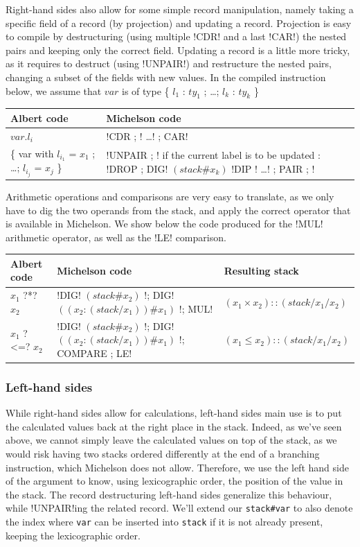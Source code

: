 \documentclass{report}
\begin{document}
Right-hand sides also allow for some simple record manipulation, namely taking a specific field of a record (by projection) and updating a record. Projection is easy to compile by destructuring (using multiple !CDR! and a last !CAR!) the nested pairs and keeping only the correct field. Updating a record is a little more tricky, as it requires to destruct (using !UNPAIR!) and restructure the nested pairs, changing a subset of the fields with new values. In the compiled instruction below, we assume that $var$ is of type \{ $l_1$ : $ty_1$ ; \ldots ; $l_k$ : $ty_k$ \}

{\small
\begin{longtable}{l|p{10cm}}
  Albert code & Michelson code \\
  \hline
  $var.l_i$ & !CDR ; ! \ldots ! ; CAR! \\
  \hline
  \{ var with $l_{i_1}$ = $x_1$ ; \ldots ; $l_{i_j}$ = $x_j$ \} & !UNPAIR ; ! \newline
  if the current label is to be updated : !DROP ; DIG! $(stack\#x_k)$ \newline
  !DIP {! \ldots !} ; PAIR ; !
\end{longtable}
}

Arithmetic operations and comparisons are very easy to translate, as we only have to dig the two operands from the stack, and apply the correct operator that is available in Michelson. We show below the code produced for the !MUL! arithmetic operator, as well as the !LE! comparison.

{\small
\begin{longtable}{l|p{9.5cm}|l}
  Albert code & Michelson code & Resulting stack\\
  \hline
  $x_1$ ?*? $x_2$ & !DIG! $(stack\#x_2)$ !; DIG! $((x_2:(stack/x_1))\#x_1)$ !; MUL! & $(x_1 \times x_2)::(stack/x_1/x_2)$\\
  \hline
  $x_1$ ?<=? $x_2$ & !DIG! $(stack\#x_2)$ !; DIG! $((x_2:(stack/x_1))\#x_1)$ !; COMPARE ; LE! & $(x_1 \le x_2)::(stack/x_1/x_2)$\\
\end{longtable}
}

\subsubsection{Left-hand sides}

While right-hand sides allow for calculations, left-hand sides main use is to put the calculated values back at the right place in the stack. Indeed, as we've seen above, we cannot simply leave the calculated values on top of the stack, as we would risk having two stacks ordered differently at the end of a branching instruction, which Michelson does not allow. Therefore, we use the left hand side of the argument to know, using lexicographic order, the position of the value in the stack. The record destructuring left-hand sides generalize this behaviour, while !UNPAIR!ing the related record. We'll extend our \texttt{stack\#var} to also denote the index where \texttt{var} can be inserted into \texttt{stack} if it is not already present, keeping the lexicographic order.
\end{document}

